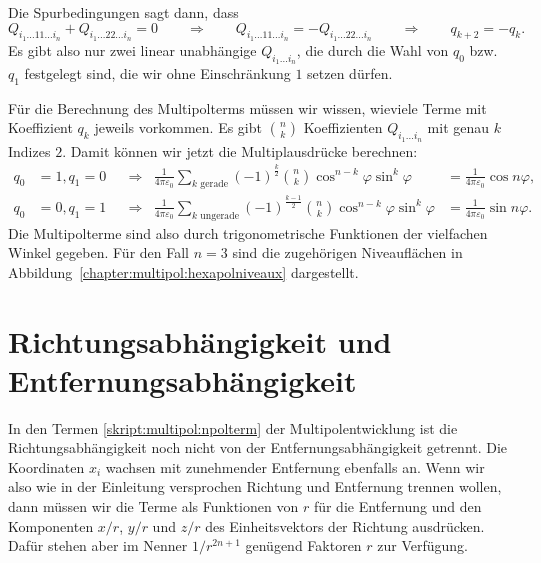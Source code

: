Die Spurbedingungen sagt dann, dass
\[
Q_{i_1\dots 11\dots i_n}
+
Q_{i_1\dots 22\dots i_n}
=
0
\qquad\Rightarrow\qquad
Q_{i_1\dots 11\dots i_n}
=-
Q_{i_1\dots 22\dots i_n}
\qquad\Rightarrow\qquad
q_{k+2}=-q_k.
\]
Es gibt also nur zwei linear unabhängige $Q_{i_1\dots i_n}$, die durch
die Wahl von $q_0$ bzw.~$q_1$ festgelegt sind, die wir ohne Einschränkung
$1$ setzen dürfen.

Für die Berechnung des Multipolterms müssen wir wissen, wieviele Terme 
mit Koeffizient $q_k$ jeweils vorkommen.
Es gibt $\binom{n}{k}$ Koeffizienten $Q_{i_1\dots i_n}$ mit genau $k$
Indizes $2$.
Damit können wir jetzt die Multiplausdrücke berechnen:
\begin{align*}
q_0&=1, q_1=0
&
&\Rightarrow&
\frac{1}{4\pi\varepsilon_0}
\sum_{\text{$k$ gerade}} (-1)^{\frac{k}2}\binom{n}{k}
	\cos^{n-k}\varphi \sin^k\varphi
&=
\frac{1}{4\pi\varepsilon_0}
\cos n\varphi,
\\
q_0&=0, q_1=1
&
&\Rightarrow&
\frac{1}{4\pi\varepsilon_0}
\sum_{\text{$k$ ungerade}} (-1)^{\frac{k-1}2}\binom{n}{k}
	\cos^{n-k}\varphi \sin^k\varphi
&=
\frac{1}{4\pi\varepsilon_0}
\sin n\varphi.
\end{align*}
Die Multipolterme sind also durch trigonometrische Funktionen der
vielfachen Winkel gegeben.
Für den Fall $n=3$ sind die zugehörigen Niveauflächen in
Abbildung~\ref{chapter:multipol:hexapolniveaux} dargestellt.

\section{Richtungsabhängigkeit und Entfernungsabhängigkeit}
In den Termen \eqref{skript:multipol:npolterm} der Multipolentwicklung
ist die Richtungsabhängigkeit noch nicht von der Entfernungsabhängigkeit
getrennt.
Die Koordinaten $x_i$ wachsen mit zunehmender Entfernung ebenfalls an.
Wenn wir also wie in der Einleitung versprochen Richtung und Entfernung
trennen wollen, dann müssen wir die Terme als Funktionen von $r$ für die
Entfernung und den Komponenten $x/r$, $y/r$ und $z/r$ des Einheitsvektors
der Richtung ausdrücken.
Dafür stehen aber im Nenner $1/r^{2n+1}$ genügend Faktoren $r$ zur Verfügung.


